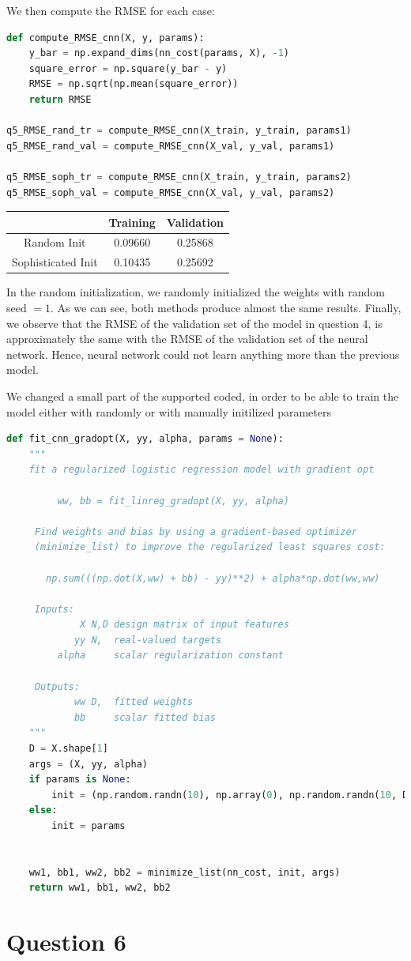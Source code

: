 \documentclass{article}
\begin{document}
We then compute the RMSE for each case:

\begin{lstlisting}[language=Python]
def compute_RMSE_cnn(X, y, params):
    y_bar = np.expand_dims(nn_cost(params, X), -1)
    square_error = np.square(y_bar - y)
    RMSE = np.sqrt(np.mean(square_error))
    return RMSE

q5_RMSE_rand_tr = compute_RMSE_cnn(X_train, y_train, params1)
q5_RMSE_rand_val = compute_RMSE_cnn(X_val, y_val, params1)

q5_RMSE_soph_tr = compute_RMSE_cnn(X_train, y_train, params2)
q5_RMSE_soph_val = compute_RMSE_cnn(X_val, y_val, params2)
\end{lstlisting}

\begin{center}
\begin{tabular}{ | c | c | c | }
\hline
 & Training & Validation \\
\hline
Random Init & 0.09660 & 0.25868 \\ 
\hline
Sophisticated Init & 0.10435 & 0.25692 \\ 
\hline
\end{tabular}
\end{center}

In the random initialization, we randomly initialized the weights with random seed $=1$.
As we can see, both methods produce almost the same results.
Finally, we observe that the RMSE of the validation set of the model in question 4, is approximately the same with the RMSE of the validation set of the neural network. Hence, neural network could not learn anything more than the previous model. 


We changed a small part of the supported coded, in order to be able to train the model either with randomly or with manually initilized parameters
\begin{lstlisting}[language=Python]
 def fit_cnn_gradopt(X, yy, alpha, params = None):
    """
    fit a regularized logistic regression model with gradient opt

         ww, bb = fit_linreg_gradopt(X, yy, alpha)

     Find weights and bias by using a gradient-based optimizer
     (minimize_list) to improve the regularized least squares cost:

       np.sum(((np.dot(X,ww) + bb) - yy)**2) + alpha*np.dot(ww,ww)

     Inputs:
             X N,D design matrix of input features
            yy N,  real-valued targets
         alpha     scalar regularization constant

     Outputs:
            ww D,  fitted weights
            bb     scalar fitted bias
    """
    D = X.shape[1]
    args = (X, yy, alpha)
    if params is None:
        init = (np.random.randn(10), np.array(0), np.random.randn(10, D), np.zeros(10))
    else:
        init = params


    ww1, bb1, ww2, bb2 = minimize_list(nn_cost, init, args)
    return ww1, bb1, ww2, bb2
\end{lstlisting}

\section*{Question 6}
\end{document}
